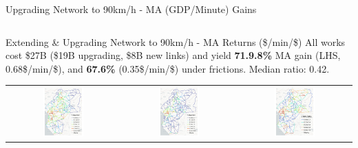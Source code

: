 \documentclass[aspectratio=169,xcolor=dvipsnames]{beamer}
\begin{document}
\begin{frame}{Upgrading Network to 90km/h - MA (GDP/Minute) Gains}
\begin{adjustbox}{center}
\begin{tabular}{@{}c@{}c@{}@{}c@{}}
\end{tabular}
\end{adjustbox}
\end{frame}

\begin{frame}{Extending \& Upgrading Network to 90km/h - MA Returns (\$/min/\$)}
\vspace{-2mm}
All works cost \$27B (\$19B upgrading, \$8B new links) and yield \textbf{71.9.8\%} MA gain (LHS, 0.68\$/min/\$), and \textbf{67.6\%} (0.35\$/min/\$) under frictions. Median ratio: 0.42.
\begin{adjustbox}{center}
\begin{tabular}{@{}c@{}c@{}@{}c@{}} 
\includegraphics[width=0.38\textwidth, trim= {0.9cm 0 0.9cm 0}, clip]{"../figures/PE/trans_CEMAC_network_MACR_gain_all_90kmh_pusd_google.pdf"} & 
\includegraphics[width=0.38\textwidth, trim= {0.9cm 0 0.9cm 0}, clip]{"../figures/PE/trans_CEMAC_network_MACR_gain_all_90kmh_pusd_bt_google.pdf"} & 
\includegraphics[width=0.38\textwidth, trim= {0.9cm 0 0.9cm 0}, clip]{"../figures/PE/trans_CEMAC_network_MACR_gain_all_90kmh_pusd_bt_ratio_google.pdf"}
\end{tabular}
\end{adjustbox}
\end{frame}
\end{document}
